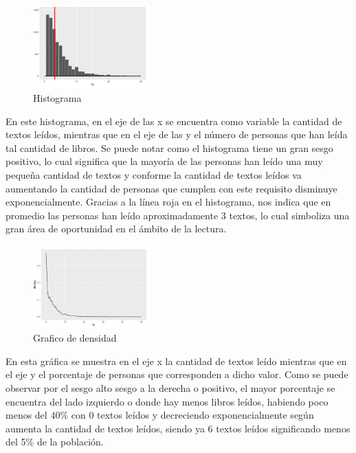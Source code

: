 \documentclass[aps,reprint]{revtex4-2}
\begin{document}
\begin{figure}[H]
    \centering
    \includegraphics[width=0.4\textwidth]{Screenshot 2025-10-10 at 15.17.58.png}
    \caption{Histograma}
    \label{fig:hist}
    
\end{figure}

En este histograma, en el eje de las x se encuentra como variable la cantidad de textos leídos,
mientras que en el eje de las y el número de personas que han leída tal cantidad de libros. Se
puede notar como el histograma tiene un gran sesgo positivo, lo cual significa que la mayoría
de las personas han leído una muy pequeña cantidad de textos y conforme la cantidad de
textos leídos va aumentando la cantidad de personas que cumplen con este requisito
disminuye exponencialmente. Gracias a la línea roja en el histograma, nos indica que en
promedio las personas han leído aproximadamente 3 textos, lo cual simboliza una gran área
de oportunidad en el ámbito de la lectura.

\begin{figure}[H]
    \centering
    \includegraphics[width=0.4\textwidth]{Screenshot 2025-10-10 at 15.19.29.png}
    \caption{Grafico de densidad}
    \label{fig:densidad}
    
\end{figure}

En esta gráfica se muestra en el eje x la cantidad de textos leído mientras que en el eje y el
porcentaje de personas que corresponden a dicho valor. Como se puede observar por el sesgo
alto sesgo a la derecha o positivo, el mayor porcentaje se encuentra del lado izquierdo o
donde hay menos libros leídos, habiendo poco menos del 40\% con 0 textos leídos y
decreciendo exponencialmente según aumenta la cantidad de textos leídos, siendo ya 6 textos
leídos significando menos del 5\% de la población.
\end{document}
